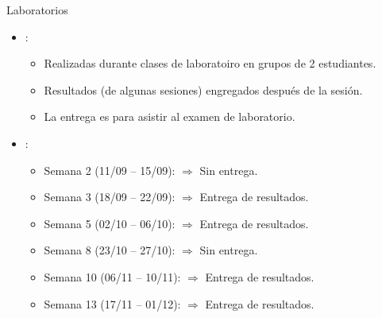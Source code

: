 \begin{frame}[t]{Laboratorios}
\begin{itemize}
  \item {}:
    \begin{itemize}
      \item Realizadas durante clases de laboratoiro en grupos de 2 estudiantes.
      \item Resultados (de algunas sesiones) engregados después de la sesión.
      \item La entrega es  para asistir al examen de laboratorio.
    \end{itemize}

  \item {}:
    \begin{itemize}
      \item Semana 2 (11/09 -- 15/09):  $\Rightarrow$ Sin entrega.
      \item Semana 3 (18/09 -- 22/09):  $\Rightarrow$ Entrega de resultados.
      \item Semana 5 (02/10 -- 06/10):  $\Rightarrow$ Entrega de resultados.
      \item Semana 8 (23/10 -- 27/10):  $\Rightarrow$ Sin entrega.
      \item Semana 10 (06/11 -- 10/11):  $\Rightarrow$ Entrega de resultados.
      \item Semana 13 (17/11 -- 01/12):  $\Rightarrow$ Entrega de resultados. 
    \end{itemize}
\end{itemize}
\end{frame}

